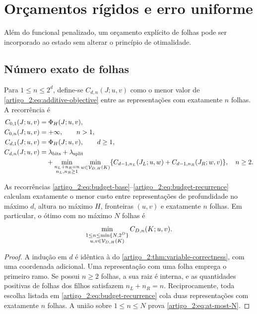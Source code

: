 \section{Orçamentos rígidos e erro uniforme}
\label{artigo_2:sec:hard-budgets}

Além do funcional penalizado, um orçamento explícito de folhas pode ser
incorporado ao estado sem alterar o princípio de otimalidade.

\subsection{Número exato de folhas}

Para $1\le n\le2^d$, define-se $C_{d,n}(J;u,v)$ como o menor valor de
\eqref{artigo_2:eq:additive-objective} entre as representações com exatamente $n$ folhas.
A recorrência é
\begin{align}
 C_{0,1}(J;u,v)&=\Phi_H(J;u,v),\label{artigo_2:eq:budget-base}\\
 C_{0,n}(J;u,v)&=+\infty,\qquad n>1,\notag\\
 C_{d,1}(J;u,v)&=\Phi_H(J;u,v),\qquad d\ge1,\label{artigo_2:eq:budget-one}\\
 C_{d,n}(J;u,v)&=\lambda_{\rm bits}+\lambda_{\rm split}\notag\\
 &\quad+\min_{\substack{n_L+n_R=n\\n_L,n_R\ge1}}
 \min_{w\in\mathcal{V}_{D,H}(K)}
 \{C_{d-1,n_L}(J_L;u,w)+C_{d-1,n_R}(J_R;w,v)\},
 \quad n\ge2.
 \label{artigo_2:eq:budget-recurrence}
\end{align}

\begin{theorem}\label{map:artigo_2:8.1}
\label{artigo_2:thm:leaf-budget}
As recorrências \eqref{artigo_2:eq:budget-base}--\eqref{artigo_2:eq:budget-recurrence}
calculam exatamente o menor custo entre representações de profundidade no
máximo $d$, altura no máximo $H$, fronteiras $(u,v)$ e exatamente $n$
folhas. Em particular, o ótimo com no máximo $N$ folhas é
\begin{equation}
 \min_{\substack{1\le n\le\min\{N,2^D\}\\
                  u,v\in\mathcal{V}_{D,H}(K)}}
 C_{D,n}(K;u,v).
 \label{artigo_2:eq:at-most-N}
\end{equation}
\end{theorem}

\begin{proof}
A indução em $d$ é idêntica à do
\cref{artigo_2:thm:variable-correctness}, com uma coordenada adicional. Uma
representação com uma folha emprega o primeiro ramo. Se possui $n\ge2$ folhas,
a sua raiz é interna, e as quantidades positivas de folhas dos filhos satisfazem
$n_L+n_R=n$. Reciprocamente, toda escolha listada em
\eqref{artigo_2:eq:budget-recurrence} cola duas representações com exatamente $n$
folhas. A união sobre $1\le n\le N$ prova \eqref{artigo_2:eq:at-most-N}.
\end{proof}

